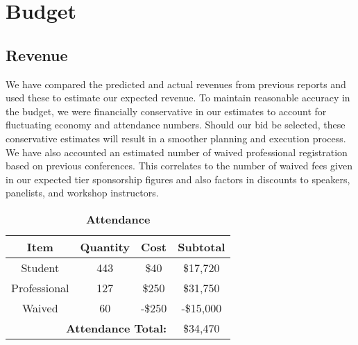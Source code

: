 \section{Budget}




\subsection{Revenue}
We have compared the predicted and actual revenues from previous reports and used these to estimate our expected revenue. To maintain reasonable accuracy in the budget, we were financially conservative in our estimates to account for fluctuating economy and attendance numbers. Should our bid be selected, these conservative estimates will result in a smoother planning and execution process. We have also accounted an estimated number of waived professional registration based on previous conferences. This  correlates to the number of waived fees given in our expected tier sponsorship figures and also factors in discounts to speakers, panelists, and workshop instructors. \\

\begin{table}[H]
\centering
\caption*{\textbf{Attendance}}
\begin{tabular}{|c|c|c|c|}
\hline
    \textbf{Item} & \textbf{Quantity} & \textbf{Cost} & \textbf{Subtotal}	\\ 
\hline
	Student			&	443	&	\$40	&	\$17,720						\\
	Professional	&	127	& 	\$250	&	\$31,750						\\
	Waived			&	60	& 	-\$250	&	-\$15,000						\\
\hline
	\multicolumn{3}{|r|}{\textbf{Attendance Total:}}	&	\$34,470		\\
\hline
\end{tabular}
\end{table}

